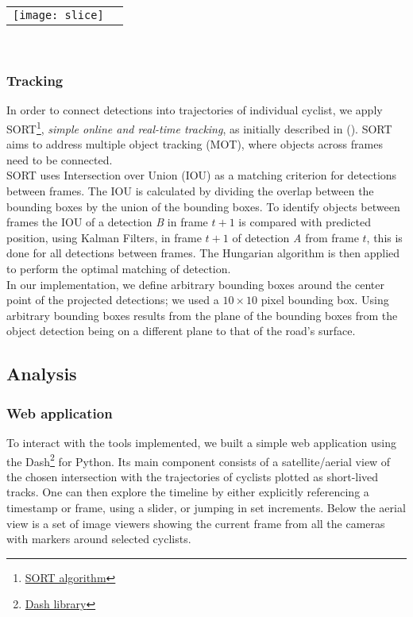 \ \\ 
\noindent
\begin{tabular}{@{}cc}
\texttt{[image: slice]} 
\end{tabular}
\label{slice}
\

\subsubsection{Tracking}

In order to connect detections into trajectories of individual cyclist, we apply 
SORT\footnote{\href{https://github.com/abewley/sort}{SORT algorithm}}, \textit{simple online and real-time tracking}, as initially described in (\cite{Bewley2016_sort}). 
SORT aims to address multiple object tracking (MOT), where objects across frames need to be connected. 
\ \\ 

SORT uses Intersection over Union (IOU) as a matching criterion for detections between frames. The IOU is 
calculated by dividing the overlap between the bounding boxes by the union of the bounding boxes. 
To identify objects between frames the IOU of a detection \textit{B} in frame $t + 1$ is compared with 
predicted position, using Kalman Filters, in frame $t + 1$ of detection \textit{A} from frame $t$, this 
is done for all detections between frames. The Hungarian algorithm is then applied to perform the optimal 
matching of detection. 
\ \\ 

In our implementation, we define arbitrary bounding boxes around the center point of the projected detections; 
we used a $10 \times 10$ pixel bounding box. Using arbitrary bounding boxes results from the plane of 
the bounding boxes from the object detection being on a different plane to that of the road's surface.

\subsection{Analysis}

\subsubsection{Web application}
To interact with the tools implemented, we built a simple web application using the Dash\footnote{\href{https://plotly.com/dash/}{Dash library}} for Python. 
Its main component consists of a satellite/aerial view of the chosen intersection with the trajectories of cyclists plotted as short-lived tracks. 
One can then explore the timeline by either explicitly referencing a timestamp or frame, using a slider, or jumping in set increments.
Below the aerial view is a set of image viewers showing the current frame from all the cameras with markers around selected cyclists.

